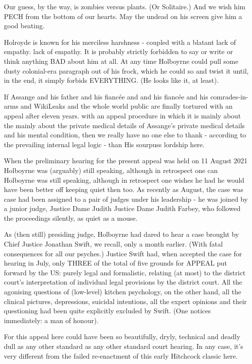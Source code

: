 \begin{multicols}{2}
Our guess, by the way, is zombies versus plants.
(Or Solitaire.) And we wish him PECH from the bottom of our hearts.
May the undead on his screen give him a good beating.

Holroyde is known for his merciless harshness - coupled with a blatant lack of empathy.
lack of empathy. It is probably
strictly forbidden to say or write or think anything BAD about him at all. At any time
Holboyrne could pull some dusty colonial-era paragraph out of his frock, which he could so
and twist it until, in the end, it simply forbids EVERYTHING. (He
looks like it, at least).

If Assange and his father and his fiancée and
and his fiancée and his comrades-in-arms and WikiLeaks and the whole world public are finally tortured with an appeal after eleven years.
with an appeal procedure in which it is mainly about the
mainly about the private medical details of
Assange's private medical details and his mental condition, then we really have no one else to thank - according to the prevailing internal legal logic - than
His sourpuss lordship here.

When the preliminary hearing for the present appeal was held on 11 August 2021
Holboyrne was (arguably) still speaking, although in retrospect one can
Holboyrne was still speaking, although in retrospect one wishes he had
he would have been better off keeping quiet then too. As recently as August, the case was
case had been assigned to a pair of judges under his leadership - he was joined by a junior judge, Justice Dame Judith
Justice Dame Judith Farbey, who followed the proceedings silently, as quiet as a mouse.

As (then still) presiding judge, Holboyrne had dared to hear a case brought by Chief Justice Jonathan Swift,
we recall, only a month earlier. (With fatal consequences for all our psyches.) Justice Swift had, when
accepted the case for hearing in July, only
THREE of the total of five grounds for APPEAL put forward by the US: purely legal and formalistic, relating (at most) to the district court's
interpretation of individual legal provisions by the district court. All the agonising questions of (low-level) kitchen psychology, on the other hand, all the clinical pictures, depressions, suicidal intentions, all the expert opinions and
their questioning had been quite explicitly excluded by Swift. (One notices immediately: a man of honour).

For this appeal here could have been so beautifully, dryly,
technical and deadly dull as any other standard
as any other standard court hearing. In any case, it's very different from the failed re-enactment
of this early Hitchcock classic here.


\end{multicols}
